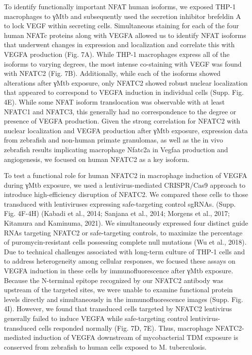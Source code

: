 To identify functionally important NFAT human isoforms, we exposed THP-1 macrophages to γMtb and subsequently used the secretion inhibitor brefeldin A to lock VEGF within secreting cells. Simultaneous staining for each of the four human NFATc proteins along with VEGFA allowed us to identify NFAT isoforms that underwent changes in expression and localization and correlate this with VEGFA production (Fig. 7A). While THP-1 macrophages express all of the isoforms to varying degrees, the most intense co-staining with VEGF was found with NFATC2 (Fig. 7B). Additionally, while each of the isoforms showed alterations after γMtb exposure, only NFATC2 showed robust nuclear localization that appeared to correspond to VEGFA induction in individual cells (Supp. Fig. 4E). While some NFAT isoform translocation was observable with at least NFATC1 and NFATC3, this generally had no correspondence to the degree or presence of VEGFA production. Given the strong correlation for NFATC2 with nuclear localization and VEGFA production after γMtb exposure, expression data from zebrafish and non-human primate granulomas, as well as the in vivo zebrafish results implicating macrophage Nfatc2a in Vegfaa production and angiogenesis, we focused on human NFATC2 as a key isoform.

To test a functional role for human NFATC2 in macrophage induction of VEGFA during γMtb exposure, we used a lentivirus-mediated CRISPR/Cas9 approach to introduce high-efficiency disruption of NFATC2. We compared these cells to those transduced with lentiviruses expressing safe-targeting control sgRNAs. (Supp. Fig. 4F-4H) (Kabadi et al., 2014; Sanjana et al., 2014; Morgens et al., 2017; Kitamura and Kaminuma, 2021). We simultaneously expressed four distinct guide RNAs targeting NFATC2 or safe-targeting controls, to maximize the percentage of puromycin-resistant cells possessing complete null mutations (Wu et al., 2018). Due to technical challenges associated with long-term culture of THP-1 cells and to address heterogeneity among cellular responses, we focused these assays on VEGFA induction in these cells by immunofluorescence after γMtb exposure. Because the N-terminal epitope recognized by our NFATC2 antibody was upstream of the targeted sites, we were unable to examine functional protein levels directly and simultaneously in the immunofluorescence images (Supp. Fig. 4I). However, we found that transduced cells targeted by NFATC2 lentivirus generally failed to induce VEGFA while safe-targeting control lentivirus-transduced cells responded normally (Fig. 7D, 7E). Thus, macrophage NFATC2-mediated induction of VEGFA downstream of mycobacterial TDM exposure is conserved from zebrafish to human cells exposed to M. tuberculosis.
 
